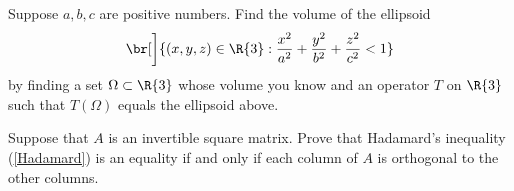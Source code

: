 \exercise
Suppose $a, b, c$ are positive numbers.  Find the volume of the ellipsoid
\[
\br[\bigg]{ (x, y, z) \in \R{3}: \frac{x^2}{a^2} + \frac{y^2}{b^2} + \frac{z^2}{c^2} < 1 }
\]
by finding a set $\Omega \subset \R{3}$ whose volume you know and an operator
$T$ on $\R{3}$ such that $T(\Omega)$ equals the ellipsoid above.


\exercise
Suppose that $A$ is an invertible square matrix. Prove that Hadamard's \mbox{inequality} (\ref{Hadamard}) is an equality if and only if each column of $A$ is orthogonal to the other columns.\label{7HadEq}


